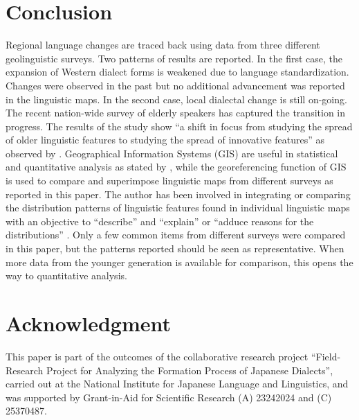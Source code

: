 \documentclass[output=paper]{LSP/langsci}
\begin{document}
\section{Conclusion}

Regional language changes are traced back using data from three different geolinguistic surveys.  Two patterns of results are reported.  In the first case, the expansion of Western dialect forms is weakened due to language standardization.  Changes were observed in the past but no additional advancement was reported in the linguistic maps.  In the second case, local dialectal change is still on-going.  The recent nation-wide survey of elderly speakers has captured the transition in progress.  The results of the study show “a shift in focus from studying the spread of older linguistic features to studying the spread of innovative features” as observed by \citet[412]{gordon_changes_2000}.  Geographical Information Systems (\textsc{GIS}) are useful in statistical and quantitative analysis as stated by \citet{lee_spatial_1993}, while the georeferencing function of \textsc{GIS} is used to compare and superimpose linguistic maps from different surveys as reported in this paper.  The author has been involved in integrating or comparing the distribution patterns of linguistic features found in individual linguistic maps with an objective to “describe” and “explain” or “adduce reasons for the distributions” \citep[216]{trudgill_linguistic_1974}.  Only a few common items from different surveys were compared in this paper, but the patterns reported should be seen as representative. When more data from the younger generation is available for comparison, this opens the way to quantitative analysis.

\section*{Acknowledgment}

This paper is part of the outcomes of the collaborative research project “Field-Research Project for Analyzing the Formation Process of Japanese Dialects”, carried out at the National Institute for Japanese Language and Linguistics, and was supported by Grant-in-Aid for Scientific Research (A) 23242024 and (C) 25370487.

\printbibliography[heading=subbibliography,notkeyword=this]
\end{document}
